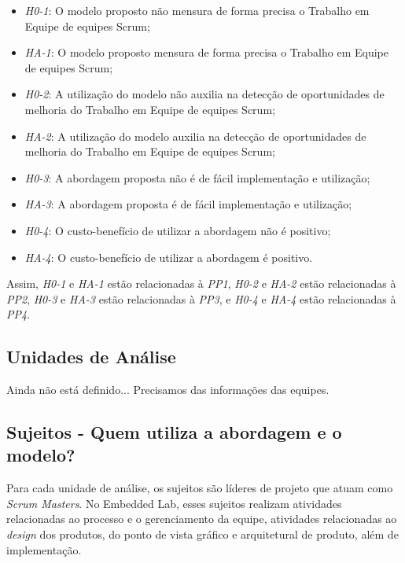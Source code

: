 \begin{itemize}
  \item \textit{H0-1}: O modelo proposto não mensura de forma precisa o Trabalho em Equipe de equipes Scrum;
  \item \textit{HA-1}: O modelo proposto mensura de forma precisa o Trabalho em Equipe de equipes Scrum;
  \item \textit{H0-2}: A utilização do modelo não auxilia na detecção de oportunidades de melhoria do Trabalho em Equipe de equipes Scrum;
  \item \textit{HA-2}: A utilização do modelo auxilia na detecção de oportunidades de melhoria do Trabalho em Equipe de equipes Scrum;
  \item \textit{H0-3}: A abordagem proposta não é de fácil implementação e utilização;
  \item \textit{HA-3}: A abordagem proposta é de fácil implementação e utilização;
  \item \textit{H0-4}: O custo-benefício de utilizar a abordagem não é positivo;
  \item \textit{HA-4}: O custo-benefício de utilizar a abordagem é positivo.
\end{itemize}

Assim, \textit{H0-1} e \textit{HA-1} estão relacionadas à \textit{PP1}, \textit{H0-2} e \textit{HA-2} estão relacionadas à \textit{PP2}, \textit{H0-3} e \textit{HA-3} estão relacionadas à \textit{PP3}, e \textit{H0-4} e \textit{HA-4} estão relacionadas à \textit{PP4}.

\subsection{Unidades de Análise}
\label{estudodecaso:design:unidades}

{\color{red} Ainda não está definido... Precisamos das informações das equipes.}

\subsection{Sujeitos - Quem utiliza a abordagem e o modelo?}
\label{estudodecaso:design:sujeitos}

Para cada unidade de análise, os sujeitos são líderes de projeto que atuam como \textit{Scrum Masters}. No Embedded Lab, esses sujeitos realizam atividades relacionadas ao processo e o gerenciamento da equipe, atividades relacionadas ao \textit{design} dos produtos, do ponto de vista gráfico e arquitetural de produto, além de implementação.

